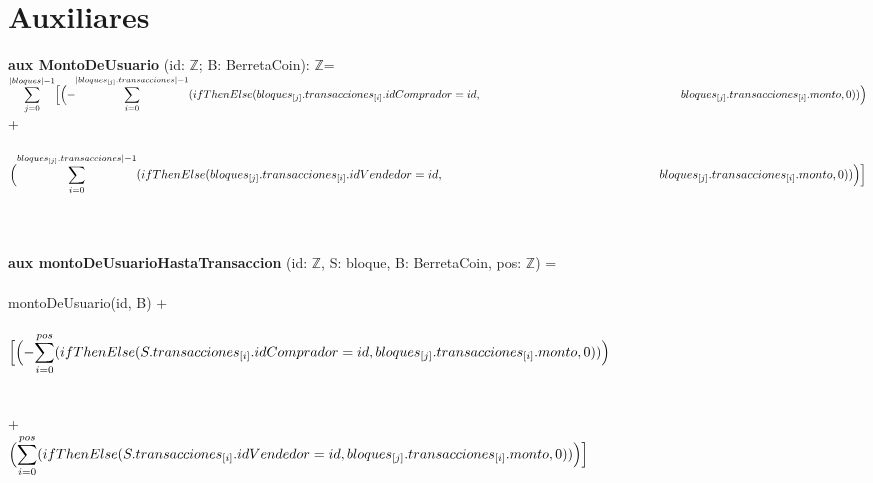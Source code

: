 \documentclass{article}
\newcommand{\Entero}{$\mathds{Z}$}
\begin{document}
\newpage
\section*{Auxiliares}

{\selectfont\textbf{aux MontoDeUsuario} (id: \Entero; B: BerretaCoin): \Entero}=\\

        \indent\indent
        $\mathlarger\sum\limits_{j=0}^{|bloques| - 1}
        \Bigl[\Bigl(-\mathlarger\sum\limits_{i=0}^{|bloques_{[j]}.transacciones|-1} (ifThenElse (bloques_{[j]}.transacciones_{[i]}.idComprador = id,\\
        \indent\indent\indent\indent\indent\indent\indent\indent\indent\indent\indent\indent bloques_{[j]}.transacciones_{[i]}.monto, 0))\Bigr)$ \\

        \indent\indent\indent\indent\indent\indent\indent\indent+\\\\

        \indent\indent\indent\indent\indent
        $\Bigl(\mathlarger\sum\limits_{i=0}^{bloques_{[j]}.transacciones|-1} (ifThenElse (bloques_{[j]}.transacciones_{[i]}.idVendedor = id,\\
        \indent\indent\indent\indent\indent\indent\indent\indent\indent\indent\indent\indent bloques_{[j]}.transacciones_{[i]}.monto, 0))\Bigr)\Bigr]$\\\\\\\\

        {\selectfont\textbf{aux montoDeUsuarioHastaTransaccion} (id: \Entero, S: bloque, B: BerretaCoin, pos: \Entero)} =\\\\
        \indent\indent montoDeUsuario(id, B) +\\\\
        \indent\indent $\Bigl[\Bigl(-\mathlarger\sum\limits_{i=0}^{pos} (ifThenElse (S.transacciones_{[i]}.idComprador = id, bloques_{[j]}.transacciones_{[i]}.monto, 0))\Bigr)$\\\\\\
        \indent\indent\indent+\\

        \indent\indent $\Bigl(\mathlarger\sum\limits_{i=0}^{pos} (ifThenElse (S.transacciones_{[i]}.idVendedor = id, bloques_{[j]}.transacciones_{[i]}.monto, 0)) \Bigr)\Bigr]$\\\\\\\\
\end{document}
